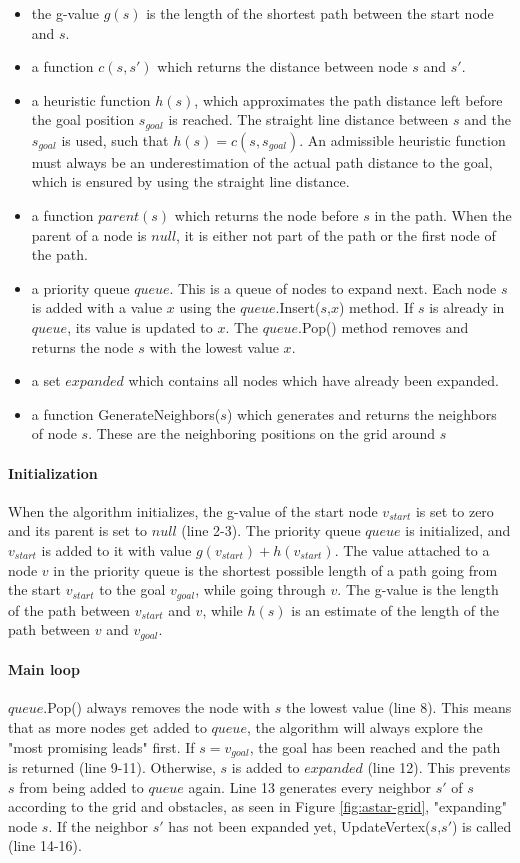 \begin{itemize}
\item the g-value $g(s)$ is the length of the shortest path between the start node and $s$.
\item a function $c(s,s')$ which returns the distance between node $s$ and $s'$.
\item a heuristic function $h(s)$, which approximates the path distance left before the goal position $s_{goal}$ is reached. The straight line distance between $s$ and the $s_{goal}$ is used, such that $h(s) = c(s,s_{goal})$. An admissible heuristic function must always be an underestimation of the actual path distance to the goal, which is ensured by using the straight line distance. 
\item a function $parent(s)$ which returns the node before $s$ in the path. When the parent of a node is $null$, it is either not part of the path or the first node of the path.
\item a priority queue $queue$. This is a queue of nodes to expand next. Each node $s$ is added with a value $x$ using the $queue.$Insert($s$,$x$) method. If $s$ is already in $queue$, its value is updated to $x$. The $queue$.Pop() method removes and returns the node $s$ with the lowest value $x$.
\item a set $expanded$ which contains all nodes which have already been expanded.
\item a function GenerateNeighbors($s$) which generates and returns the neighbors of node $s$. These are the neighboring positions on the grid around $s$
\end{itemize}
\paragraph{Initialization}
When the algorithm initializes, the g-value of the start node $v_{start}$ is set to zero and its parent is set to $null$ (line 2-3). The priority queue $queue$ is initialized, and $v_{start}$ is added to it with value $g(v_{start}) + h(v_{start})$. The value attached to a node $v$ in the priority queue is the shortest possible length of a path going from the start $v_{start}$ to the goal $v_{goal}$, while going through $v$. The g-value is the length of the path between $v_{start}$ and $v$, while $h(s)$ is an estimate of the length of the path between $v$ and $v_{goal}$.
\paragraph{Main loop}
$queue$.Pop() always removes the node with $s$ the lowest value (line 8). This means that as more nodes get added to $queue$, the algorithm will always explore the "most promising leads" first. If $s = v_{goal}$, the goal has been reached and the path is returned (line 9-11). Otherwise, $s$ is added to $expanded$ (line 12). This prevents $s$ from being added to $queue$ again. Line 13 generates every neighbor $s'$ of $s$ according to the grid and obstacles, as seen in Figure \ref{fig:astar-grid}, "expanding" node $s$. If the neighbor $s'$ has not been expanded yet, UpdateVertex($s$,$s'$) is called (line 14-16).
